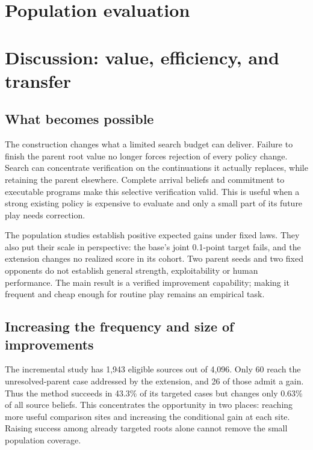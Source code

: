 \documentclass[11pt]{article}
\begin{document}



\section{Population evaluation}



\section{Discussion: value, efficiency, and transfer}
\label{sec:discussion}
\subsection{What becomes possible}
The construction changes what a limited search budget can deliver. Failure to
finish the parent root value no longer forces rejection of every policy change.
Search can concentrate verification on the continuations it actually replaces,
while retaining the parent elsewhere. Complete arrival beliefs and commitment
to executable programs make this selective verification valid. This is useful
when a strong existing policy is expensive to evaluate and only a small part
of its future play needs correction.

The population studies establish positive expected gains under fixed laws.
They also put their scale in perspective: the base's joint 0.1-point target
fails, and the extension changes no realized score in its cohort. Two parent
seeds and two fixed opponents do not establish general strength, exploitability
or human performance. The main result is a verified improvement capability;
making it frequent and cheap enough for routine play remains an empirical task.

\subsection{Increasing the frequency and size of improvements}
The incremental study has 1,943 eligible sources out of 4,096. Only 60 reach
the unresolved-parent case addressed by the extension, and 26 of those admit
a gain. Thus the method succeeds in 43.3\% of its targeted cases but changes
only 0.63\% of all source beliefs. This concentrates the opportunity in two
places: reaching more useful comparison sites and increasing the conditional
gain at each site. Raising success among already targeted roots alone cannot
remove the small population coverage.
\end{document}
